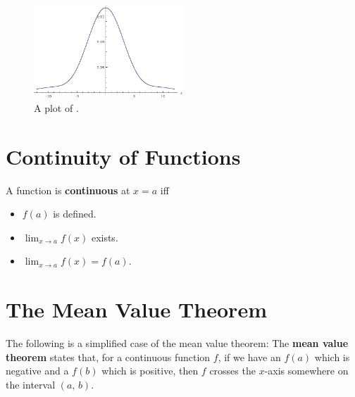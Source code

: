 \begin{figure}[h]
    \centering
    \includegraphics[width=0.5\textwidth]{continuous/limits/indeterminate_form}
    \caption{A plot of .}
    \label{fig:indeterminate_form}
\end{figure}

\section{Continuity of Functions}
\begin{defn}
  A function is \textbf{continuous} at $x=a$ iff
  \begin{itemize}
    \item $f(a)$ is defined.
    \item $\lim_{x\to a} f(x)$ exists.
    \item $\lim_{x\to a} f(x)=f(a)$.
  \end{itemize}
\end{defn}

\section{The Mean Value Theorem}
The following is a simplified case of the mean value theorem:
The \textbf{mean value theorem} states that, for a continuous function $f$,
if we have an $f(a)$ which is negative and a $f(b)$ which is positive,
then $f$ crosses the $x$-axis somewhere on the interval $(a, \, b)$.
